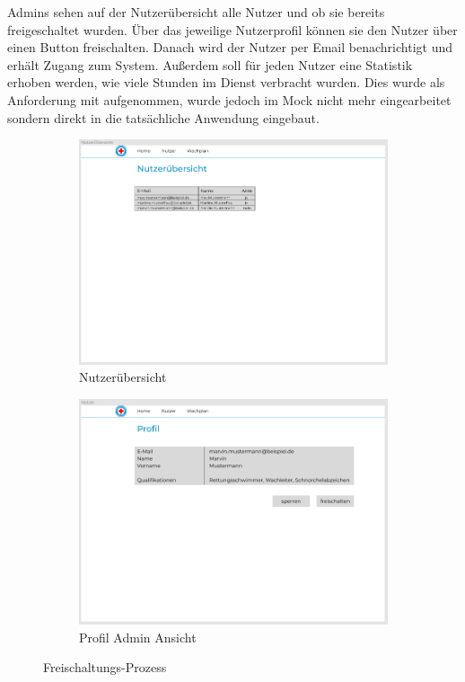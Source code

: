 \documentclass[fontsize=12pt,openright,oneside,paper=a4,BCOR=1cm]{scrbook}
\begin{document}
Admins sehen auf der Nutzerübersicht alle Nutzer und ob sie bereits freigeschaltet wurden. Über das jeweilige Nutzerprofil können sie den Nutzer über einen Button freischalten. Danach wird der Nutzer per Email benachrichtigt und erhält Zugang zum System. Außerdem soll für jeden Nutzer eine Statistik erhoben werden, wie viele Stunden im Dienst verbracht wurden. Dies wurde als Anforderung mit aufgenommen, wurde jedoch im Mock nicht mehr eingearbeitet sondern direkt in die tatsächliche Anwendung eingebaut.\\

\begin{figure}[H]
  \centering
  \begin{subfigure}[b]{0.4\linewidth}
    \includegraphics[width=\linewidth]{Anlagen/Figma/6-Nutzeruebersicht.png}
    \caption{Nutzerübersicht}
  \end{subfigure}
  \begin{subfigure}[b]{0.4\linewidth}
    \includegraphics[width=\linewidth]{Anlagen/Figma/7-ProfilAdminSicht.png}
    \caption{Profil Admin Ansicht}
  \end{subfigure}
  \caption{Freischaltungs-Prozess}
  \label{fig:freischaltprozess}
\end{figure}
\end{document}
